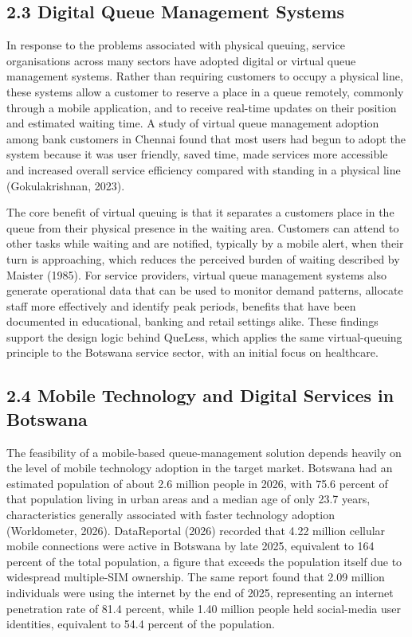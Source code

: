 \documentclass[
]{article}
\begin{document}
\subsection{2.3 Digital Queue Management
Systems}\label{digital-queue-management-systems}

In response to the problems associated with physical queuing, service
organisations across many sectors have adopted digital or virtual queue
management systems. Rather than requiring customers to occupy a physical
line, these systems allow a customer to reserve a place in a queue
remotely, commonly through a mobile application, and to receive
real-time updates on their position and estimated waiting time. A study
of virtual queue management adoption among bank customers in Chennai
found that most users had begun to adopt the system because it was user
friendly, saved time, made services more accessible and increased
overall service efficiency compared with standing in a physical line
(Gokulakrishnan, 2023).

The core benefit of virtual queuing is that it separates a
customer\textquotesingle s place in the queue from their physical
presence in the waiting area. Customers can attend to other tasks while
waiting and are notified, typically by a mobile alert, when their turn
is approaching, which reduces the perceived burden of waiting described
by Maister (1985). For service providers, virtual queue management
systems also generate operational data that can be used to monitor
demand patterns, allocate staff more effectively and identify peak
periods, benefits that have been documented in educational, banking and
retail settings alike. These findings support the design logic behind
QueLess, which applies the same virtual-queuing principle to the
Botswana service sector, with an initial focus on healthcare.

\subsection{2.4 Mobile Technology and Digital Services in
Botswana}\label{mobile-technology-and-digital-services-in-botswana}

The feasibility of a mobile-based queue-management solution depends
heavily on the level of mobile technology adoption in the target market.
Botswana had an estimated population of about 2.6 million people in
2026, with 75.6 percent of that population living in urban areas and a
median age of only 23.7 years, characteristics generally associated with
faster technology adoption (Worldometer, 2026). DataReportal (2026)
recorded that 4.22 million cellular mobile connections were active in
Botswana by late 2025, equivalent to 164 percent of the total
population, a figure that exceeds the population itself due to
widespread multiple-SIM ownership. The same report found that 2.09
million individuals were using the internet by the end of 2025,
representing an internet penetration rate of 81.4 percent, while 1.40
million people held social-media user identities, equivalent to 54.4
percent of the population.
\end{document}
